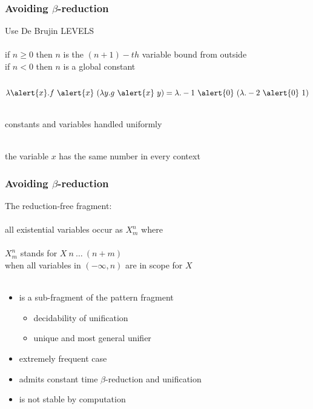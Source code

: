 \documentclass{beamer}
\begin{document}
\begin{frame}
 \frametitle{Avoiding $\beta$-reduction}

 Use \alert{De Brujin LEVELS}\\~\\

 if $n \geq 0$ then $n$ is the $(n+1)-th$ variable bound from outside\\
 if $n < 0$ then $n$ is a global constant\\~\\

 $$\lambda \alert{x}. f~\alert{x}~(\lambda y. g~\alert{x}~y)
 = \lambda. -1~\alert{0}~(\lambda. -2~\alert{0}~1)$$

 ~\\constants and variables handled uniformly

 ~\\the variable $x$ has the same number in every context
\end{frame}

\begin{frame}
 \frametitle{Avoiding $\beta$-reduction}

 The \alert{reduction-free fragment}:\\~\\

 all existential variables occur as $X^n_m$ where\\~\\

 $X^n_m$ stands for $X~n~\ldots~(n+m)$\\
 when all variables in $(-\infty,n)$ are in scope for $X$\\~\\

 \begin{itemize}
  \item is a sub-fragment of the pattern fragment
    \begin{itemize}
     \item decidability of unification
     \item unique and most general unifier
    \end{itemize}
  \item extremely frequent case
  \item admits constant time $\beta$-reduction and unification
  \item is not stable by computation
 \end{itemize}
\end{frame}
\end{document}
